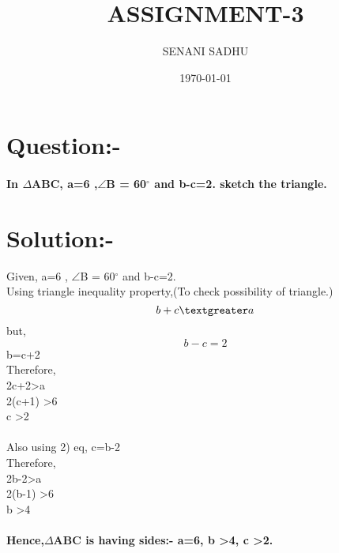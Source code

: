 \documentclass[a4paper,12pt]{article}
\title{ASSIGNMENT-3}
\author{SENANI SADHU}
\date{\today}
\begin{document}
	\maketitle
	\section{Question:-}
	\paragraph{In $\Delta$ABC, a=6 ,$\angle$B = 60$^{\circ}$ and b-c=2. sketch the triangle.}
	\section{Solution:-}
	Given, a=6 , $\angle$B = 60$^{\circ}$ and b-c=2.\\
	Using triangle inequality property,\hspace{1cm}(To check possibility of triangle.)\\
	\begin{equation}
		b+c \textgreater  a
	\end{equation}
	but,\\
	\begin{equation}
		 b-c=2
	\end{equation}
\hspace{6cm}b=c+2\\
Therefore,\\
\hspace{4cm}2c+2\textgreater a\\
\hspace{4cm}2(c+1) \textgreater 6\\
\hspace{4cm}c \textgreater 2\\\\
Also using 2) eq, c=b-2\\
Therefore,\\
\hspace{4cm}2b-2\textgreater a\\
\hspace{4cm}2(b-1) \textgreater 6\\
\hspace{4cm}b \textgreater 4
\paragraph{Hence,$\Delta$ABC is having sides:- a=6, b \textgreater 4, c \textgreater 2.}
\end{document}
